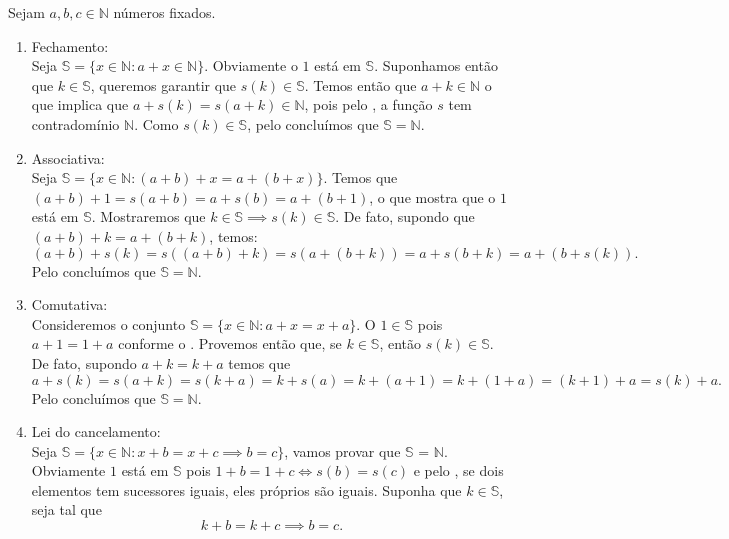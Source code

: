 \documentclass[../main.tex]{subfiles}
\begin{document}
\begin{dem}
    Sejam $a,b,c \in \mathbb{N}$ números fixados.
    \begin{enumerate}[label=(\roman*)]    
        \item Fechamento: \\
            Seja $\mathbb{S} = \{ x \in \mathbb{N} : a + x \in \mathbb{N} \}$. Obviamente o $1$ está em $\mathbb{S}$. Suponhamos então que $k \in \mathbb{S}$, queremos  garantir que $s(k) \in \mathbb{S}$. Temos então que $a + k \in \mathbb{N}$ o que implica que $a + s(k) = s(a + k) \in \mathbb{N}$, pois pelo , a função $s$ tem contradomínio $\mathbb{N}$. Como $s(k) \in \mathbb{S}$, pelo  concluímos que $\mathbb{S} = \mathbb{N}$.
        \item Associativa: \\
             Seja $\mathbb{S} = \{ x \in \mathbb{N} : (a + b) + x = a + (b + x) \}$. Temos que \\
             $(a + b) + 1 = s(a + b) = a + s(b) = a + (b + 1)$, o que mostra que o $1$ está em $\mathbb{S}$. 
             Mostraremos que $k \in \mathbb{S} \implies s(k) \in \mathbb{S}$. De fato, supondo que $(a+b)+k = a+(b+k)$, temos:
             \[ (a + b) + s(k) = s( (a + b) + k) = s(a + (b + k)) = a + s(b + k) = a + (b + s(k)). \] 
             Pelo  concluímos que $\mathbb{S} = \mathbb{N}$.
        \item Comutativa: \\
            Consideremos o conjunto $\mathbb{S} = \{ x \in \mathbb{N} : a + x = x + a\}$. O $1 \in \mathbb{S}$ pois 
            $a + 1 = 1 + a$ conforme o .
            Provemos então que, se $k \in \mathbb{S}$, então $s(k) \in \mathbb{S}$. De fato, supondo $a+k = k+a$ temos que 
            \[ a + s(k) = s(a + k) = s(k + a) = k + s(a) = k + (a + 1)  = k + (1+a) = (k + 1) + a = s(k) + a. \]
            Pelo  concluímos que $\mathbb{S} = \mathbb{N}$.
        \item Lei do cancelamento:  \\
            Seja $\mathbb{S} = \{ x \in \mathbb{N} : x + b = x + c \implies b = c \}$, vamos provar que $\mathbb{S}$ = $\mathbb{N}$. Obviamente $1$ está em $\mathbb{S}$ pois $1 + b = 1 + c \iff s(b) = s(c)$ e pelo , se dois elementos tem sucessores iguais, eles próprios são iguais. Suponha que $k \in \mathbb{S}$, seja tal que 
            \[ k + b = k + c \implies b = c. \] 

\end{enumerate}
\end{dem}
\end{document}
